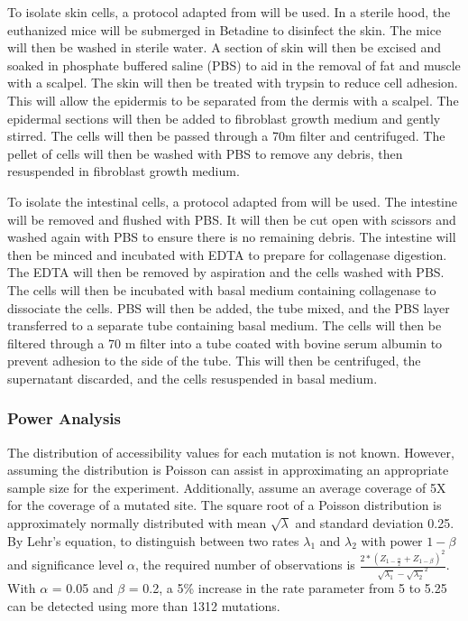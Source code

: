 To isolate skin cells, a protocol adapted from \cite{jensen_isolation_2013} will be used.
In a sterile hood, the euthanized mice will be submerged in Betadine to disinfect the skin. The mice will then be washed in sterile water. A section of skin will then be excised and soaked in phosphate buffered saline (PBS) to aid in the removal of fat and muscle with a scalpel. The skin will then be treated with trypsin to reduce cell adhesion. This will allow the epidermis to be separated from the dermis with a scalpel. The epidermal sections will then be 
added to fibroblast growth medium and gently stirred. The cells will then be passed through a 70\mu m filter and centrifuged. The pellet of cells will then be washed with PBS to remove any debris, then resuspended in fibroblast growth medium.

To isolate the intestinal cells, a protocol adapted from \cite{orourke_isolation_2016} will be used.
The intestine will be removed and flushed with PBS. It will then be cut open with scissors and washed again with PBS to ensure there is no remaining debris. The intestine will then be minced and incubated with EDTA to prepare for collagenase digestion. The EDTA will then be removed by aspiration and the cells washed with PBS. The cells will then be incubated with basal medium containing collagenase to dissociate the cells. PBS will then be added, the tube mixed, and the PBS layer transferred to a separate tube containing basal medium. The cells will then be filtered through a 70 \mu m filter into a tube coated with bovine serum albumin to prevent adhesion to the side of the tube. This will then be centrifuged, the supernatant discarded, and the cells resuspended in basal medium.

\subsubsection{Power Analysis}

The distribution of accessibility values for each mutation is not known. However, assuming the distribution is Poisson can assist in approximating an appropriate sample size for the experiment. Additionally, assume an average coverage of 5X for the coverage of a mutated site. The square root of a Poisson distribution is approximately normally distributed with mean $\sqrt{\lambda}$ and standard deviation 0.25.
By Lehr's equation, to distinguish between two rates $\lambda_1$ and $\lambda_2$ with power $1 - \beta$ and significance level $\alpha$, the required number of observations is $\frac{2 * (Z_{1 - \frac{\alpha}{2}} + Z_{1 - \beta})^2}{{\sqrt{\lambda_1} - \sqrt{\lambda_2}}^2}$. With $\alpha$ = 0.05 and $\beta$ = 0.2, a 5\% increase in the rate parameter from 5 to 5.25 can be detected using more than 1312 mutations.

